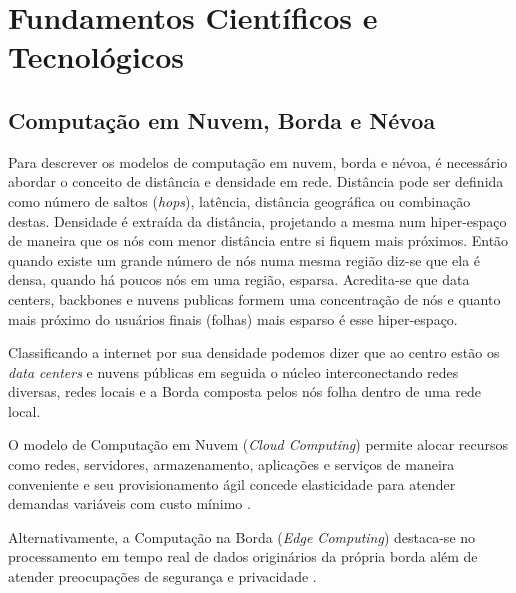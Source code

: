 \chapter{Fundamentos Científicos e Tecnológicos}


\section{Computação em Nuvem, Borda e Névoa}

Para descrever os modelos de computação em nuvem, borda e névoa, é necessário
abordar o conceito de distância e densidade em rede. Distância pode ser definida
como número de saltos (\emph{hops}), latência, distância geográfica ou combinação destas.
Densidade é extraída da distância, projetando a mesma num hiper-espaço de maneira que os
nós com menor distância entre si fiquem mais próximos. Então quando existe um
grande número de nós numa mesma região diz-se que ela é densa, quando há poucos
nós em uma região, esparsa. Acredita-se que data centers, backbones e nuvens publicas
formem uma concentração de nós e quanto mais próximo do usuários finais (folhas)
mais esparso é esse hiper-espaço.

Classificando a internet por sua densidade podemos dizer que ao centro estão
os \emph{data centers} e nuvens públicas em seguida o núcleo interconectando redes diversas,
redes locais e a Borda composta pelos nós folha dentro de uma rede local.

O modelo de Computação em Nuvem (\emph{Cloud Computing})
permite alocar recursos como redes, servidores, armazenamento, aplicações e serviços
de maneira conveniente e seu provisionamento ágil concede elasticidade para atender
demandas variáveis com custo mínimo \cite{NIST2011}.

Alternativamente, a Computação na Borda (\emph{Edge Computing}) destaca-se no
processamento em tempo real de dados originários da própria borda além de atender
preocupações de segurança e privacidade \cite{Shi2016}.

